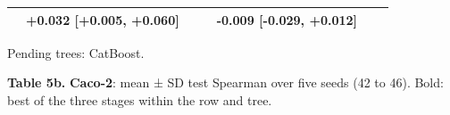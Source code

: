 \documentclass[
  10pt,
]{article}
\begin{document}
\begin{longtable}[]{@{}lllllll@{}}
\begin{minipage}[t]{0.12\columnwidth}
\end{minipage} & \begin{minipage}[t]{0.12\columnwidth}\raggedright
+0.032 {[}+0.005, +0.060{]}\strut
\end{minipage} & \begin{minipage}[t]{0.12\columnwidth}\raggedright
\strut
\end{minipage} & \begin{minipage}[t]{0.12\columnwidth}\raggedright
\strut
\end{minipage} & \begin{minipage}[t]{0.12\columnwidth}\raggedright
-0.009 {[}-0.029, +0.012{]}\strut
\end{minipage} & \begin{minipage}[t]{0.12\columnwidth}\raggedright
\strut
\end{minipage} & \begin{minipage}[t]{0.12\columnwidth}\raggedright
\strut
\end{minipage}\tabularnewline
\bottomrule
\end{longtable}

Pending trees: CatBoost.

\textbf{Table 5b.} \textbf{Caco-2}: mean ± SD test Spearman over five
seeds (42 to 46). Bold: best of the three stages within the row and
tree.
\end{document}

